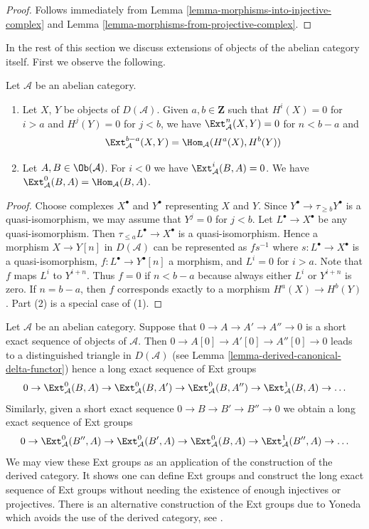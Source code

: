\begin{proof}
Follows immediately from
Lemma \ref{lemma-morphisms-into-injective-complex}
and
Lemma \ref{lemma-morphisms-from-projective-complex}.
\end{proof}

\noindent
In the rest of this section we discuss extensions of objects of the
abelian category itself. First we observe the following.

\begin{lemma}
\label{lemma-negative-exts}
Let $\mathcal{A}$ be an abelian category.
\begin{enumerate}
\item Let $X$, $Y$ be objects of $D(\mathcal{A})$. Given $a, b \in \mathbf{Z}$
such that $H^i(X) = 0$ for $i > a$ and $H^j(Y) = 0$
for $j < b$, we have $\Ext^n_\mathcal{A}(X, Y) = 0$ for
$n < b - a$ and
$$
\Ext^{b - a}_\mathcal{A}(X, Y) = \Hom_\mathcal{A}(H^a(X), H^b(Y))
$$
\item Let $A, B \in \Ob(\mathcal{A})$.
For $i < 0$ we have $\Ext^i_\mathcal{A}(B, A) = 0$.
We have $\Ext^0_\mathcal{A}(B, A) = \Hom_\mathcal{A}(B, A)$.
\end{enumerate}
\end{lemma}

\begin{proof}
Choose complexes $X^\bullet$ and $Y^\bullet$ representing $X$ and $Y$.
Since $Y^\bullet \to \tau_{\geq b}Y^\bullet$ is a quasi-isomorphism,
we may assume that $Y^j = 0$ for $j < b$.
Let $L^\bullet \to X^\bullet$ be any quasi-isomorphism.
Then $\tau_{\leq a}L^\bullet \to X^\bullet$
is a quasi-isomorphism. Hence a morphism $X \to Y[n]$
in $D(\mathcal{A})$ can be represented as $fs^{-1}$ where
$s : L^\bullet \to X^\bullet$ is a quasi-isomorphism,
$f : L^\bullet \to Y^\bullet[n]$ a morphism, and
$L^i = 0$ for $i > a$. Note that $f$ maps $L^i$ to $Y^{i + n}$.
Thus $f = 0$ if $n < b - a$ because always either $L^i$ or $Y^{i + n}$ is
zero. If $n = b - a$, then $f$ corresponds exactly to a morphism
$H^a(X) \to H^b(Y)$. Part (2) is a special case of (1).
\end{proof}

\noindent
Let $\mathcal{A}$ be an abelian category.
Suppose that $0 \to A \to A' \to A'' \to 0$ is a short exact
sequence of objects of $\mathcal{A}$. Then
$0 \to A[0] \to A'[0] \to A''[0] \to 0$ leads to a distinguished
triangle in $D(\mathcal{A})$ (see
Lemma \ref{lemma-derived-canonical-delta-functor})
hence a long exact sequence of Ext groups
$$
0 \to \Ext^0_\mathcal{A}(B, A) \to
\Ext^0_\mathcal{A}(B, A') \to
\Ext^0_\mathcal{A}(B, A'') \to
\Ext^1_\mathcal{A}(B, A) \to \ldots
$$
Similarly, given a short exact sequence $0 \to B \to B' \to B'' \to 0$
we obtain a long exact sequence of Ext groups
$$
0 \to \Ext^0_\mathcal{A}(B'', A) \to
\Ext^0_\mathcal{A}(B', A) \to
\Ext^0_\mathcal{A}(B, A) \to
\Ext^1_\mathcal{A}(B'', A) \to \ldots
$$
We may view these Ext groups as an application of the construction of the
derived category. It shows one can define Ext groups and construct
the long exact sequence of Ext groups without needing the existence of enough
injectives or projectives. There is an alternative construction of the Ext
groups due to Yoneda which avoids the use of the derived category, see
\cite{Yoneda}.

